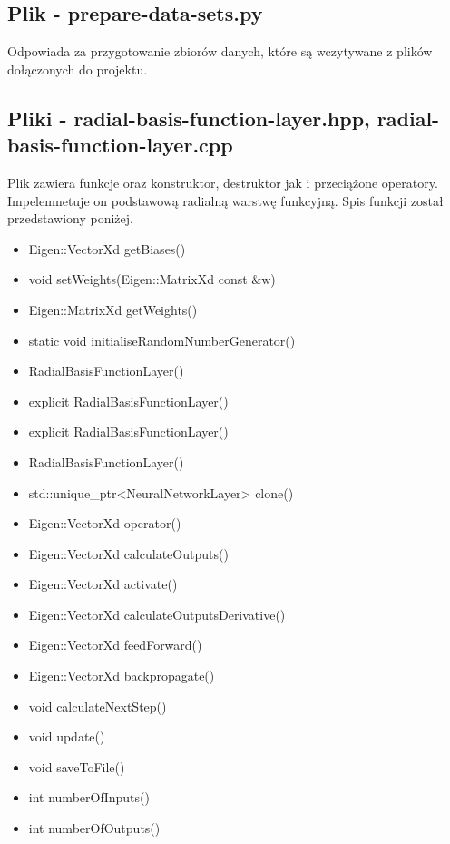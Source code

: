 \documentclass{classrep}
\begin{document}
{        \subsection{Plik - prepare-data-sets.py}
        {
            Odpowiada za przygotowanie zbiorów danych, które są wczytywane z plików
            dołączonych do projektu.
        }

        \subsection{Pliki - radial-basis-function-layer.hpp, radial-basis-function-layer.cpp}
        {
            Plik zawiera funkcje oraz konstruktor, destruktor jak i przeciążone operatory.
            Impelemnetuje on podstawową radialną warstwę funkcyjną.
            Spis funkcji został przedstawiony poniżej.
            \begin{itemize}
                \item Eigen::VectorXd getBiases()
                \item void setWeights(Eigen::MatrixXd const \&w)
                \item Eigen::MatrixXd getWeights()
                \item static void initialiseRandomNumberGenerator()
                \item RadialBasisFunctionLayer()
                \item explicit RadialBasisFunctionLayer()
                \item explicit RadialBasisFunctionLayer()
                \item RadialBasisFunctionLayer()
                \item std::unique\_ptr<NeuralNetworkLayer> clone()
                \item Eigen::VectorXd operator()
                \item Eigen::VectorXd calculateOutputs()
                \item Eigen::VectorXd activate()
                \item Eigen::VectorXd calculateOutputsDerivative()
                \item Eigen::VectorXd feedForward()
                \item Eigen::VectorXd backpropagate()
                \item void calculateNextStep()
                \item void update()
                \item void saveToFile()
                \item int numberOfInputs()
                \item int numberOfOutputs()
            \end{itemize}
        }

}
\end{document}
